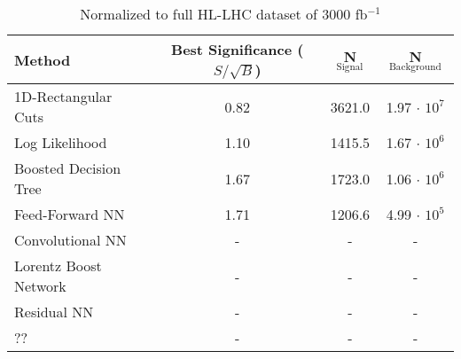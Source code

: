 \documentclass{article}
\begin{document}
\begin{table}[h!]
  \begin{center}
    \begin{tabular}{|l|c|c|c|} %
      \hline\hline
      \textbf{Method} & Best Significance ($S/\sqrt{B}$) & \textbf{N$_{\mathrm{Signal}}$} & \textbf{N$_{\mathrm{Background}}$}\\
      \hline
      1D-Rectangular Cuts & 0.82 & 3621.0 & 1.97  $\cdot$ $10^7$\\
      Log Likelihood & 1.10 & 1415.5 & 1.67 $\cdot$ $10^6$ \\
      Boosted Decision Tree & 1.67 & 1723.0 & 1.06 $\cdot$ $10^6$ \\
      Feed-Forward NN & 1.71 & 1206.6 & 4.99 $\cdot$ $10^5$ \\
      Convolutional NN & - & - & - \\
      Lorentz Boost Network & - & - & - \\
      Residual NN & - & - & - \\
      ?? & - & - & - \\
      \hline\hline
    \end{tabular}
    \caption{Normalized to full HL-LHC dataset of 3000 fb$^{-1}$}
  \end{center}
\end{table}
\end{document}
